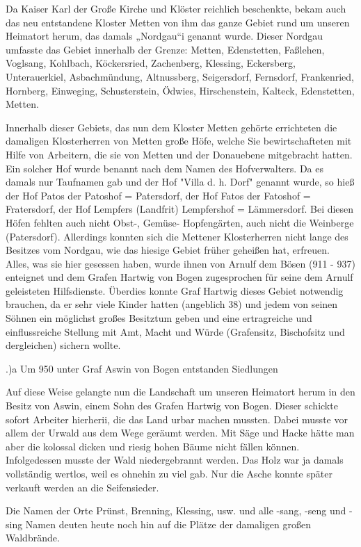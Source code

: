 Da Kaiser Karl der Große Kirche und Klöster reichlich beschenkte, bekam auch das
neu entstandene Kloster Metten von ihm das ganze Gebiet rund um unseren
Heimatort herum, das damals „Nordgau“i genannt wurde. Dieser Nordgau umfasste
das Gebiet innerhalb der Grenze: Metten, Edenstetten, Faßlehen, Voglsang,
Kohlbach, Köckersried, Zachenberg, Klessing, Eckersberg, Unterauerkiel,
Asbachmündung, Altnussberg, Seigersdorf, Fernsdorf, Frankenried, Hornberg,
Einweging, Schusterstein, Ödwies, Hirschenstein, Kalteck, Edenstetten, Metten.

Innerhalb dieser Gebiets, das nun dem Kloster Metten gehörte errichteten die
damaligen Klosterherren von Metten große Höfe, welche Sie bewirtschafteten mit
Hilfe von Arbeitern, die sie von Metten und der Donauebene mitgebracht hatten.
Ein solcher Hof wurde benannt nach dem Namen des Hofverwalters. Da es damals nur
Taufnamen gab und der Hof "Villa d. h. Dorf" genannt wurde, so hieß der Hof
Patos der Patoshof = Patersdorf, der Hof Fatos der Fatoshof = Fratersdorf, der
Hof Lempfers (Landfrit) Lempfershof = Lämmersdorf. Bei diesen Höfen fehlten auch
nicht Obst-, Gemüse- Hopfengärten, auch nicht die Weinberge (Patersdorf).
Allerdings konnten sich die Mettener Klosterherren nicht lange des Besitzes vom
Nordgau, wie das hiesige Gebiet früher geheißen hat, erfreuen. Alles, was sie
hier gesessen haben, wurde ihnen von Arnulf dem Bösen (911 - 937) enteignet und
dem Grafen Hartwig von Bogen zugesprochen für seine dem Arnulf geleisteten
Hilfsdienste. Überdies konnte Graf Hartwig dieses Gebiet notwendig brauchen, da
er sehr viele Kinder hatten (angeblich 38) und jedem von seinen Söhnen ein
möglichst großes Besitztum geben und eine ertragreiche und einflussreiche
Stellung mit Amt, Macht und Würde (Grafensitz, Bischofsitz und dergleichen)
sichern wollte.

.)a Um 950 unter Graf Aswin von Bogen entstanden Siedlungen

Auf diese Weise gelangte nun die Landschaft um unseren Heimatort herum in den
Besitz von Aswin, einem Sohn des Grafen Hartwig von Bogen. Dieser schickte
sofort Arbeiter hierherii, die das Land urbar machen mussten. Dabei musste vor
allem der Urwald aus dem Wege geräumt werden. Mit Säge und Hacke hätte man aber
die kolossal dicken und riesig hohen Bäume nicht fällen können. Infolgedessen
musste der Wald niedergebrannt werden. Das Holz war ja damals vollständig
wertlos, weil es ohnehin zu viel gab. Nur die Asche konnte später verkauft
werden an die Seifensieder.

Die Namen der Orte Prünst, Brenning, Klessing, usw. und alle -sang, -seng und
-sing Namen deuten heute noch hin auf die Plätze der damaligen großen
Waldbrände.

